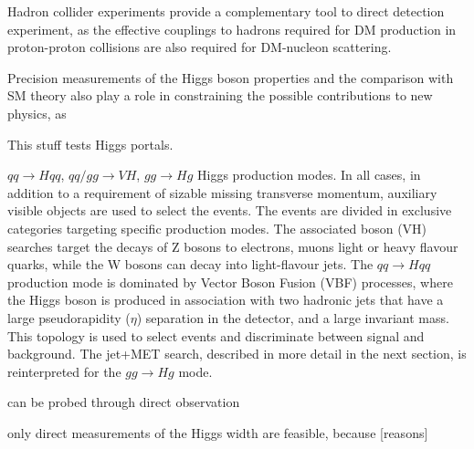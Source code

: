 Hadron collider experiments provide a complementary tool to direct detection experiment, as the effective couplings to hadrons required for DM production in proton-proton collisions are also required for DM-nucleon scattering. %




Precision measurements of the Higgs boson properties and the comparison with SM theory also play a role in constraining the possible contributions to new physics, as 





This stuff tests Higgs portals.



$qq \rightarrow H qq$, $qq/gg \rightarrow VH$, $gg \rightarrow Hg$ Higgs production modes. 
In all cases, in addition to a requirement of sizable missing transverse momentum, auxiliary visible objects are used to select the events. 
The events are divided in exclusive categories targeting specific production modes. The associated boson (VH) searches target the decays of Z bosons to electrons, muons light or heavy flavour quarks, while the W bosons can decay into light-flavour jets. 
The $qq \rightarrow H qq$ production mode is dominated by Vector Boson Fusion (VBF) processes, where the Higgs boson is produced in association with two hadronic jets that have a large pseudorapidity ($\eta$)
separation in the detector, and a large invariant mass. This topology is used to select events and discriminate between signal and background. 
The jet+MET search, described in more detail in the next section, is reinterpreted for the $gg \rightarrow Hg$ mode. 


can be probed through direct observation  

only direct measurements of the Higgs width are feasible, because [reasons]

